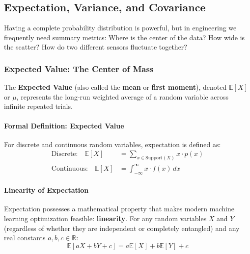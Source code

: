 \subsection{Expectation, Variance, and Covariance}\label{subsec:prob_moments}

Having a complete probability distribution is powerful, but in engineering we frequently need summary metrics: Where is the center of the data? How wide is the scatter? How do two different sensors fluctuate together?

\subsubsection{Expected Value: The Center of Mass}
The \textbf{Expected Value} (also called the \textbf{mean} or \textbf{first moment}), denoted $\mathbb{E}[X]$ or $\mu$, represents the long-run weighted average of a random variable across infinite repeated trials.

\paragraph{Formal Definition: Expected Value}

For discrete and continuous random variables, expectation is defined as:
\begin{align}
\text{Discrete:}\quad \mathbb{E}[X] &= \sum_{x \in \text{Support}(X)} x \cdot p(x) \label{eq:exp_discrete} \\
\text{Continuous:}\quad \mathbb{E}[X] &= \int_{-\infty}^{\infty} x \cdot f(x)\,dx \label{eq:exp_continuous}
\end{align}


\paragraph{Linearity of Expectation}
Expectation possesses a mathematical property that makes modern machine learning optimization feasible: \textbf{linearity}. For any random variables $X$ and $Y$ (regardless of whether they are independent or completely entangled) and any real constants $a, b, c \in \mathbb{R}$:
\begin{equation}
\mathbb{E}[aX + bY + c] = a\mathbb{E}[X] + b\mathbb{E}[Y] + c\label{eq:linearity_of_expectation}
\end{equation}

